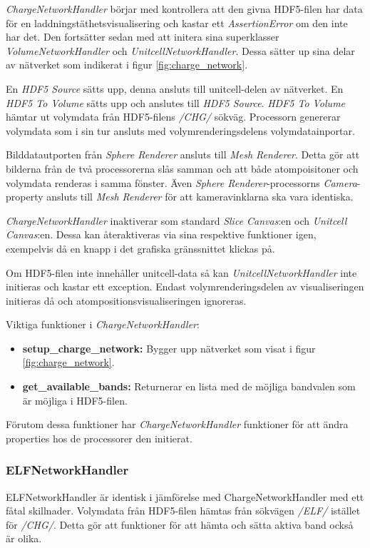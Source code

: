 \textit{ChargeNetworkHandler} börjar med kontrollera att den givna HDF5-filen har data för en laddningstäthetsvisualisering och kastar ett \textit{AssertionError} om den inte har det. Den fortsätter sedan med att initera sina superklasser \textit{VolumeNetworkHandler} och \textit{UnitcellNetworkHandler}. Dessa sätter up sina delar av nätverket som indikerat i figur \ref{fig:charge_network}. 

En \textit{HDF5 Source} sätts upp, denna ansluts till unitcell-delen av nätverket. En \textit{HDF5 To Volume} sätts upp och anslutes till \textit{HDF5 Source}. \textit{HDF5 To Volume} hämtar ut volymdata från HDF5-filens \textit{/CHG/} sökväg. Processorn genererar volymdata som i 
sin tur ansluts med volymrenderingsdelens volymdatainportar. 

\newpage

Bilddatautporten från \textit{Sphere Renderer} ansluts till \textit{Mesh Renderer}. Detta gör att bilderna från de två processorerna slås samman och att både atompoisitoner och volymdata renderas i samma fönster. Även \textit{Sphere Renderer}-processorns \textit{Camera}-property ansluts till \textit{Mesh Renderer} för att kameravinklarna ska vara identiska.

\textit{ChargeNetworkHandler} inaktiverar som standard \textit{Slice Canvas}:en och \textit{Unitcell Canvas}:en. Dessa kan återaktiveras via sina respektive funktioner igen, exempelvis då en knapp i det grafiska gränssnittet klickas på.

Om HDF5-filen inte innehåller unitcell-data så kan \textit{UnitcellNetworkHandler} inte initieras och kastar ett exception. Endast volymrenderingsdelen av visualiseringen initieras då och atompositionsvisualiseringen ignoreras. 

Viktiga funktioner i \textit{ChargeNetworkHandler}:
\begin{itemize}
    \setlength\itemsep{0em}
    \item \textbf{setup\_charge\_network: } Bygger upp nätverket som visat i figur \ref{fig:charge_network}.
    \item \textbf{get\_available\_bands: } Returnerar en lista med de möjliga bandvalen som är möjliga i HDF5-filen.
\end{itemize}

Förutom dessa funktioner har \textit{ChargeNetworkHandler} funktioner för att ändra properties hos de processorer den initierat.

\subsubsection{ELFNetworkHandler}
ELFNetworkHandler är identisk i jämförelse med ChargeNetworkHandler med ett fåtal skillnader. Volymdata från HDF5-filen hämtas från sökvägen \textit{/ELF/} istället för \textit{/CHG/}. Detta gör att funktioner för att hämta och sätta aktiva band också är olika. 

